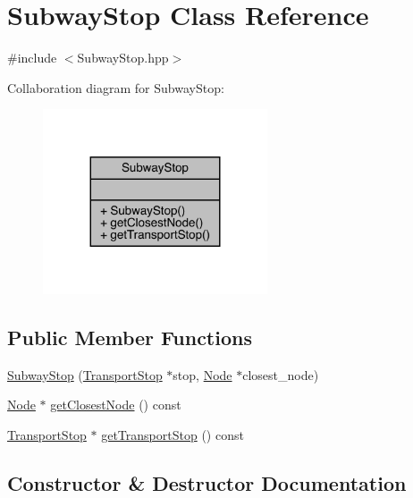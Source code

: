 \hypertarget{class_subway_stop}{}\section{Subway\+Stop Class Reference}
\label{class_subway_stop}


{\ttfamily \#include $<$Subway\+Stop.\+hpp$>$}



Collaboration diagram for Subway\+Stop\+:\nopagebreak
\begin{figure}[H]
\begin{center}
\leavevmode
\includegraphics[width=188pt]{class_subway_stop__coll__graph}
\end{center}
\end{figure}
\subsection*{Public Member Functions}
\begin{DoxyCompactItemize}
\item 
\hyperlink{class_subway_stop_ae29e3908fe6203af1123150c03b026fe}{Subway\+Stop} (\hyperlink{class_transport_stop}{Transport\+Stop} $\ast$stop, \hyperlink{class_node}{Node} $\ast$closest\+\_\+node)
\item 
\hyperlink{class_node}{Node} $\ast$ \hyperlink{class_subway_stop_a575f9f1c940378cb193b2690ad972cf8}{get\+Closest\+Node} () const
\item 
\hyperlink{class_transport_stop}{Transport\+Stop} $\ast$ \hyperlink{class_subway_stop_a5cc277b4da7f0decf74518de16b2966b}{get\+Transport\+Stop} () const
\end{DoxyCompactItemize}


\subsection{Constructor \& Destructor Documentation}
\hypertarget{class_subway_stop_ae29e3908fe6203af1123150c03b026fe}{}\label{class_subway_stop_ae29e3908fe6203af1123150c03b026fe} 
